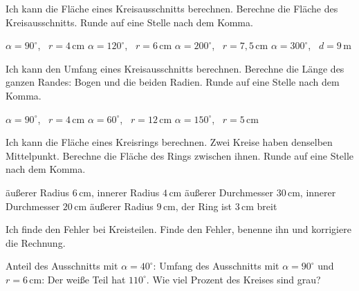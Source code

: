 \begin{aufgabe}{Ich kann die Fläche eines Kreisausschnitts berechnen.}
Berechne die Fläche des Kreisausschnitts. Runde auf eine Stelle nach dem Komma.
\begin{teile}
\teil $\alpha = 90^\circ$, \ $r = 4\,\text{cm}$ \quad \leerfeld[cm²]
\teil $\alpha = 120^\circ$, \ $r = 6\,\text{cm}$ \quad \leerfeld[cm²]
\teil $\alpha = 200^\circ$, \ $r = 7{,}5\,\text{cm}$ \quad \leerfeld[cm²]
\teil $\alpha = 300^\circ$, \ $d = 9\,\text{m}$ \quad \leerfeld[m²]
\end{teile}
\end{aufgabe}

\begin{aufgabe}{Ich kann den Umfang eines Kreisausschnitts berechnen.}
Berechne die Länge des ganzen Randes: Bogen und die beiden Radien. Runde auf eine Stelle nach dem Komma.

\begin{kreis}[1.2]\end{kreis}

\begin{teile}
\teil $\alpha = 90^\circ$, \ $r = 4\,\text{cm}$ \quad \leerfeld[cm]
\teil $\alpha = 60^\circ$, \ $r = 12\,\text{cm}$ \quad \leerfeld[cm]
\teil $\alpha = 150^\circ$, \ $r = 5\,\text{cm}$ \quad \leerfeld[cm]
\end{teile}
\end{aufgabe}

\begin{aufgabe}{Ich kann die Fläche eines Kreisrings berechnen.}
Zwei Kreise haben denselben Mittelpunkt. Berechne die Fläche des Rings zwischen ihnen. Runde auf eine Stelle nach dem Komma.
\begin{teile}
\teil äußerer Radius $6\,\text{cm}$, innerer Radius $4\,\text{cm}$ \quad \leerfeld[cm²]
\teil äußerer Durchmesser $30\,\text{cm}$, innerer Durchmesser $20\,\text{cm}$ \quad \leerfeld[cm²]
\teil äußerer Radius $9\,\text{cm}$, der Ring ist $3\,\text{cm}$ breit \quad \leerfeld[cm²]
\end{teile}
\end{aufgabe}

\begin{aufgabe}{Ich finde den Fehler bei Kreisteilen.}
Finde den Fehler, benenne ihn und korrigiere die Rechnung.
\begin{teile}
\teil Anteil des Ausschnitts mit $\alpha = 40^\circ$: 
\teil Umfang des Ausschnitts mit $\alpha = 90^\circ$ und $r = 6\,\text{cm}$: 
\teil Der weiße Teil hat $110^\circ$. Wie viel Prozent des Kreises sind grau? 
\end{teile}

\begin{kreis}[1.1]\mittelpunkt{}\end{kreis}

\end{aufgabe}

